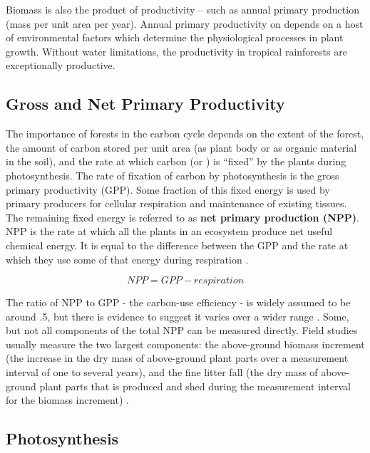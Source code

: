 Biomass is also the product of productivity -- such as annual primary production (mass per unit area per year). Annual primary productivity  on depends on a host of environmental factors which determine the physiological processes in plant growth. Without water limitations, the productivity in tropical rainforests are exceptionally productive. 

\subsection{Gross and Net Primary Productivity}


The importance of forests in the carbon cycle depends on the extent of the forest, the amount of carbon stored per unit area (as plant body or as organic material in the soil), and the rate at which carbon (or \CO) is ``fixed'' by the plants during photosynthesis. The rate of fixation of carbon by photosynthesis is the \gls{gross primary productivity} (GPP). Some fraction of this fixed energy is used by primary producers for cellular respiration and maintenance of existing tissues. The remaining fixed energy is referred to as \textbf{net primary production (NPP)}. NPP is the rate at which all the plants in an ecosystem produce net useful chemical energy. It is equal to the difference between the GPP and the rate at which they use some of that energy during respiration \citep{corlett2014ecology}. 

\begin{equation}
		NPP = GPP - respiration
\end{equation}

The ratio of NPP to GPP - the carbon-use efficiency - is widely assumed to be around .5, but there is evidence to suggest it varies over a wider range \citep{delucia2007forest}. Some, but not all components of the total NPP can be measured directly. Field studies usually measure the two largest components: the above-ground biomass increment (the increase in the dry mass of above-ground plant parts over a measurement interval of one to several years), and the fine litter fall (the dry mass of above-ground plant parts that is produced and shed during the measurement interval for the biomass increment) \citep{ruimy1996turc}. 
  
\subsection{Photosynthesis}

